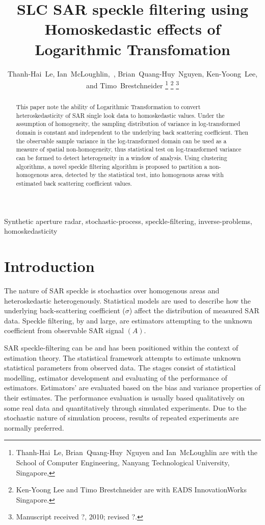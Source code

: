 \documentclass[journal]{IEEEtran}
\title{ SLC SAR speckle filtering using Homoskedastic effects of Logarithmic Transfomation }
\author{Thanh-Hai~Le,
        Ian~McLoughlin,~\IEEEmembership{Senior Member,~IEEE}, 
	Brian~Quang-Huy~Nguyen,
	Ken-Yoong~Lee, 
	and Timo~Brestchneider %
\thanks{Thanh-Hai~Le, Brian~Quang-Huy~Nguyen and Ian~McLoughlin are with the School of Computer Engineering, 
Nanyang Technological University, Singapore,}%
\thanks{Ken-Yoong Lee and Timo Brestchneider are with EADS InnovationWorks Singapore.}%
\thanks{Manuscript received ?, 2010; revised ?.}}
\begin{document}
\maketitle

\begin{abstract}
This paper note the ability of Logarithmic Transformation to convert heteroskedasticity of SAR single look data to homoskedastic values. Under the assumption of homogeneity, the sampling distribution of variance in log-transformed domain is constant and independent to the underlying back scattering coefficient. Then the observable sample variance in the log-transformed domain can be used as a measure of spatial non-homogeneity, thus statistical test on log-transformed variance can be formed to detect heterogeneity in a window of analysis. Using clustering algorithms, a novel speckle filtering algorithm is proposed to partition a non-homogenous area,  detected by the statistical test, into homogenous areas with estimated back scattering coefficient values.
\end{abstract}

\begin{IEEEkeywords}
Synthetic aperture radar, stochastic-process, speckle-filtering, inverse-problems, homoskedasticity
\end{IEEEkeywords}


\IEEEpeerreviewmaketitle

\section{Introduction}

The nature of SAR speckle is stochastics over homogenous areas and heteroskedastic heterogenously. Statistical models are used to describe how the underlying back-scattering coefficient ($\sigma$) affect the distribution of measured SAR data. Speckle filtering, by and large, are estimators attempting to the unknown coefficient from observable SAR signal $(A)$. 

SAR speckle-filtering can be and has been positioned within the context of estimation theory\cite{Touzi_2002_TGRS}. The statistical framework attempts to estimate unknown statistical parameters from observed data. The stages consist of statistical modelling, estimator development and evaluating of the performance of estimators. Estimators' are evaluated based on the bias and variance properties of their estimates. The performance evaluation is usually based qualitatively on some real data and quantitatively through simulated experiments. Due to the stochastic nature of simulation process, results of repeated experiments are normally preferred.
\end{document}
